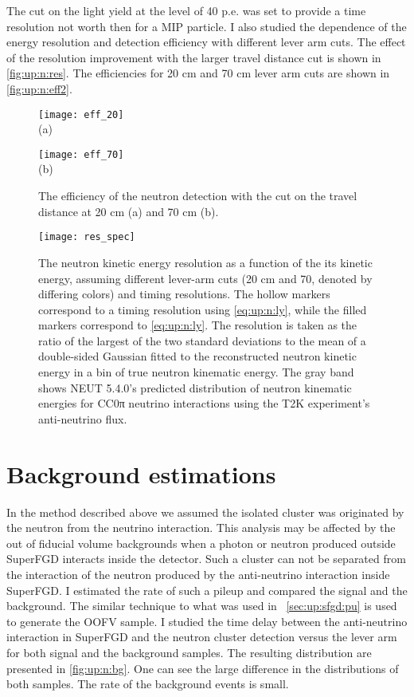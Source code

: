 \documentclass[main.tex]{subfiles}
\begin{document}
The cut on the light yield at the level of 40 p.e. was set to provide a time resolution not worth then for a MIP particle. I also studied the dependence of the energy resolution and detection efficiency with different lever arm cuts. The effect of the resolution improvement with the larger travel distance cut is shown in \autoref{fig:up:n:res}. The efficiencies for 20 cm and 70 cm lever arm cuts are shown in \autoref{fig:up:n:eff2}.

\begin{figure}[!ht]
	\centering
	\begin{minipage}{0.4\linewidth}
		\centering
		\texttt{[image: eff\_20]} \\ (a)
	\end{minipage}
	\begin{minipage}{0.4\linewidth}
		\centering
		\texttt{[image: eff\_70]} \\ (b)
	\end{minipage}
	\caption{The efficiency of the neutron detection with the cut on the travel distance at 20 cm (a) and 70 cm (b).}
	\label{fig:up:n:eff2}
\end{figure}

\begin{figure}[!ht]
	\centering
	\texttt{[image: res\_spec]}
	\caption{The neutron kinetic energy resolution as a function of the its kinetic energy, assuming different lever-arm cuts (20 cm and 70, denoted by differing colors) and timing resolutions. The hollow markers correspond to a timing resolution using \autoref{eq:up:n:ly}, while the filled markers correspond to \autoref{eq:up:n:ly}. The resolution is taken as the ratio of the largest of the two standard deviations to the mean of a double-sided Gaussian fitted to the reconstructed neutron kinetic energy in a bin of true neutron kinematic energy. The gray band shows NEUT 5.4.0’s predicted distribution of neutron kinematic energies for CC0π neutrino interactions using the T2K experiment’s anti-neutrino flux.}
	\label{fig:up:n:res}
\end{figure}

\section{Background estimations}
In the method described above we assumed the isolated cluster was originated by the neutron from the neutrino interaction. This analysis may be affected by the out of fiducial volume backgrounds when a photon or neutron produced outside SuperFGD interacts inside the detector. Such a cluster can not be separated from the interaction of the neutron produced by the anti-neutrino interaction inside SuperFGD. I estimated the rate of such a pileup and compared the signal and the background. The similar technique to what was used in ~\autoref{sec:up:sfgd:pu} is used to generate the OOFV sample. I studied the time delay between the anti-neutrino interaction in SuperFGD and the neutron cluster detection versus the lever arm for both signal and the background samples. The resulting distribution are presented in \autoref{fig:up:n:bg}. One can see the large difference in the distributions of both samples. The rate of the background events is small.
\end{document}
